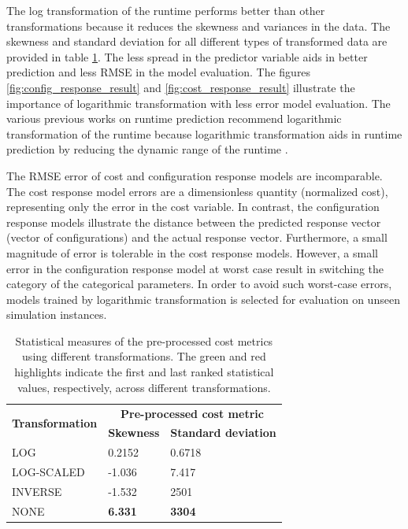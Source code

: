 The log transformation of the runtime performs better than other transformations because it reduces the skewness and variances in the data. The skewness and standard deviation for all different types of transformed data are provided in table \ref{table:skewness}. The less spread in the predictor variable aids in better prediction and less RMSE in the model evaluation. The figures \ref{fig:config_response_result} and \ref{fig:cost_response_result} illustrate the importance of logarithmic transformation with less error model evaluation. \raggedbottom The various previous works on runtime prediction recommend logarithmic transformation of the runtime because logarithmic transformation aids in runtime prediction by reducing the dynamic range of the runtime \cite{SMAC_mainpaper} \cite{SMAC_extendedpaper}. 

The RMSE error of cost and configuration response models are incomparable. The cost response model errors are a dimensionless quantity (normalized cost), representing only the error in the cost variable. In contrast, the configuration response models illustrate the distance between the predicted response vector (vector of configurations) and the actual response vector. Furthermore, a small magnitude of error is tolerable in the cost response models. However, a small error in the configuration response model at worst case result in switching the category of the categorical parameters. In order to avoid such worst-case errors, models trained by logarithmic transformation is selected for evaluation on unseen simulation instances.

\begin{table}[!h]
\centering
\begin{tabular}{|l|l|l|}
\hline
\multicolumn{1}{|c|}{\multirow{2}{*}{\textbf{Transformation}}} & \multicolumn{2}{c|}{\textbf{Pre-processed cost metric}} \\ \cline{2-3} 
\multicolumn{1}{|c|}{} & \multicolumn{1}{c|}{\textbf{Skewness}} & \multicolumn{1}{c|}{\textbf{Standard deviation}} \\ \hline
LOG & \color{OliveGreen}0.2152 & \color{OliveGreen}0.6718\\ \hline
LOG-SCALED & -1.036 & 7.417 \\ \hline
INVERSE & -1.532 & 2501 \\ \hline
NONE & \color{red}\textbf{6.331} & \color{red}\textbf{3304} \\ \hline
\end{tabular}
\captionsetup{justification=justified}
\caption[Statistical measures of the pre-processed cost metrics]{Statistical measures of the pre-processed cost metrics using different transformations. The green and red highlights indicate the first and last ranked statistical values, respectively, across different transformations.}
\label{table:skewness}
\end{table}

